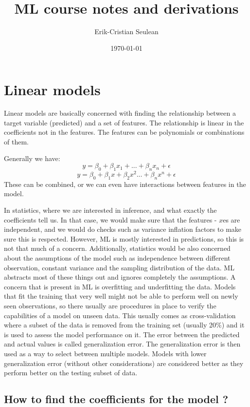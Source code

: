 \documentclass[12pt,a4paper]{article}
\author{Erik-Cristian Seulean}
\title{ML course notes and derivations}
\date{\today}
\begin{document}
\newpage
\maketitle

\section{Linear models}

Linear models are basically concerned with finding the relationship between a target variable (predicted) and a set of features. The relationship is linear in the coefficients not in the features. The features can be polynomials or combinations of them. 

Generally we have: $$y = \beta_{0} + \beta_{1}x_{1} + ... + \beta_{n}x_{n} + \epsilon$$ 
$$y = \beta_{0} + \beta_{1}x + \beta_{2}x^{2} ... + \beta_{n}x^{n} + \epsilon $$
These can be combined, or we can even have interactions between features in the model.

In statistics, where we are interested in inference, and what exactly the coefficients tell us. In that case, we would make sure that the features - $x$es are independent, and we would do checks such as variance inflation factors to make sure this is respected. However, ML is mostly interested in predictions, so this is not that much of a concern. Additionally, statistics would be also concerned about the assumptions of the model such as independence between different observation, constant variance and the sampling distribution of the data. ML abstracts most of these things out and ignores completely the assumptions.
A concern that is present in ML is overfitting and underfitting the data. Models that fit the training that very well might not be able to perform well on newly seen observations, so there usually are procedures in place to verify the capabilities of a model on unseen data. This usually comes as cross-validation where a subset of the data is removed from the training set (usually 20\%) and it is used to assess the model performance on it. The error between the predicted and actual values is called generalization error. The generalization error is then used as a way to select between multiple models. Models with lower generalization error (without other considerations) are considered better as they perform better on the testing subset of data.

\subsection{How to find the coefficients for the model ?}
\end{document}
